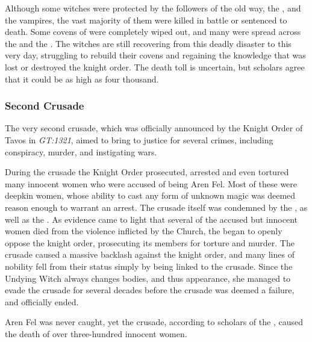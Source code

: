 Although some witches were protected by the followers of the old way, the
, and the vampires, the vast majority of them were
killed in battle or sentenced to death. Some covens of 
were completely wiped out, and many were spread across the
 and the . The witches
are still recovering from this deadly disaster to this very day, struggling to
rebuild their covens and regaining the knowledge that was lost or destroyed
the knight order. The death toll is uncertain, but scholars agree that it
could be as high as four thousand.

\subsubsection{Second Crusade}
\label{sec:Second Crusade}

The very second crusade, which was officially announced by the Knight Order of
Tavos in \emph{GT:1321}, aimed to bring  to justice for
several crimes, including conspiracy, murder, and instigating wars.

During the crusade the Knight Order prosecuted, arrested and even tortured
many innocent women who were accused of being Aren Fel. Most of these were
deepkin women, whose ability to cast any form of unknown magic was deemed
reason enough to warrant an arrest. The crusade itself was condemned by the
, as well as the . As evidence came to light that several of the accused but innocent
women died from the violence inflicted by the Church, the  began to openly oppose the knight order, prosecuting its members for
torture and murder. The crusade caused a massive backlash against the knight
order, and many lines of nobility fell from their status simply by being
linked to the crusade. Since the Undying Witch always changes bodies, and thus
appearance, she managed to evade the crusade for several decades before the
crusade was deemed a failure, and officially ended.

Aren Fel was never caught, yet the crusade, according to scholars of the
, caused the death of over three-hundred innocent
women.
